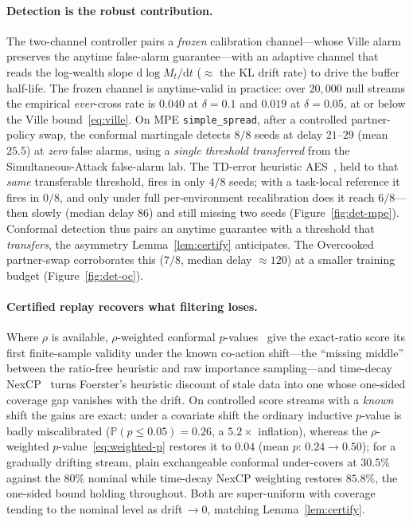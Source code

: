 \documentclass[sigconf]{aamas}
\begin{document}
\paragraph{Detection is the robust contribution.} The two-channel controller pairs
a \emph{frozen} calibration channel---whose Ville alarm preserves the anytime
false-alarm guarantee---with an adaptive channel that reads the log-wealth slope
$\mathrm{d}\log M_t/\mathrm{d}t$ ($\approx$ the KL drift rate) to drive the buffer
half-life. The frozen channel is anytime-valid in practice: over $20{,}000$ null
streams the empirical \emph{ever}-cross rate is $0.040$ at $\delta=0.1$ and $0.019$
at $\delta=0.05$, at or below the Ville bound~\eqref{eq:ville}. On MPE
\texttt{simple\_spread}, after a controlled partner-policy swap, the conformal
martingale detects $8/8$ seeds at delay $21$--$29$ (mean $25.5$) at \emph{zero}
false alarms, using a \emph{single threshold transferred} from the
Simultaneous-Attack false-alarm lab. The TD-error heuristic
AES~\cite{wang2026tracking}, held to that \emph{same} transferable threshold, fires
in only $4/8$ seeds; with a task-local reference it fires in $0/8$, and only under
full per-environment recalibration does it reach $6/8$---then slowly (median delay
$86$) and still missing two seeds (Figure~\ref{fig:det-mpe}). Conformal detection
thus pairs an anytime guarantee with a threshold that \emph{transfers}, the
asymmetry Lemma~\ref{lem:certify} anticipates. The Overcooked partner-swap
corroborates this ($7/8$, median delay ${\approx}120$) at a smaller training budget
(Figure~\ref{fig:det-oc}).

\paragraph{Certified replay recovers what filtering loses.} Where $\rho$ is
available, $\rho$-weighted conformal $p$-values~\cite{tibshirani2019conformal} give
the exact-ratio score its first finite-sample validity under the known co-action
shift---the ``missing middle'' between the ratio-free heuristic and raw importance
sampling---and time-decay NexCP~\cite{barber2023beyond} turns Foerster's heuristic
discount of stale data into one whose one-sided coverage gap vanishes with the
drift. On controlled score streams with a \emph{known} shift the gains are exact:
under a covariate shift the ordinary inductive $p$-value is badly miscalibrated
($\mathbb{P}(p\le0.05)=0.26$, a $5.2\times$ inflation), whereas the
$\rho$-weighted $p$-value~\eqref{eq:weighted-p} restores it to $0.04$ (mean $p$:
$0.24\!\to\!0.50$); for a gradually drifting stream, plain exchangeable conformal
under-covers at $30.5\%$ against the $80\%$ nominal while time-decay NexCP
weighting restores $85.8\%$, the one-sided bound holding throughout. Both are
super-uniform with coverage tending to the nominal level as drift$\,\to0$, matching
Lemma~\ref{lem:certify}.
\end{document}
